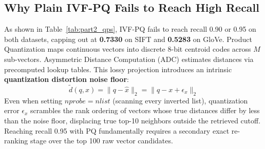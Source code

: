\documentclass[11pt,a4paper]{article}
\begin{document}
\begin{table}[htbp]
\centering
\small
\caption{Build Cost, Memory Footprint, and Bytes per Vector at Recall $\ge 0.95$ Operating Point}
\label{tab:part2_cost}
\end{table}

\subsection{Why Plain IVF-PQ Fails to Reach High Recall}
As shown in Table~\ref{tab:part2_qps}, IVF-PQ fails to reach recall 0.90 or 0.95 on both datasets, capping out at \textbf{0.7330} on SIFT and \textbf{0.5283} on GloVe. 
Product Quantization maps continuous vectors into discrete 8-bit centroid codes across $M$ sub-vectors. Asymmetric Distance Computation (ADC) estimates distances via precomputed lookup tables. This lossy projection introduces an intrinsic \textbf{quantization distortion noise floor}:
\begin{equation}
\tilde{d}(q, x) = \|q - \hat{x}\|_2 = \|q - x + \epsilon_x\|_2
\end{equation}
Even when setting $nprobe = nlist$ (scanning every inverted list), quantization error $\epsilon_x$ scrambles the rank ordering of vectors whose true distances differ by less than the noise floor, displacing true top-10 neighbors outside the retrieved cutoff. Reaching recall 0.95 with PQ fundamentally requires a secondary exact re-ranking stage over the top 100 raw vector candidates.
\end{document}
